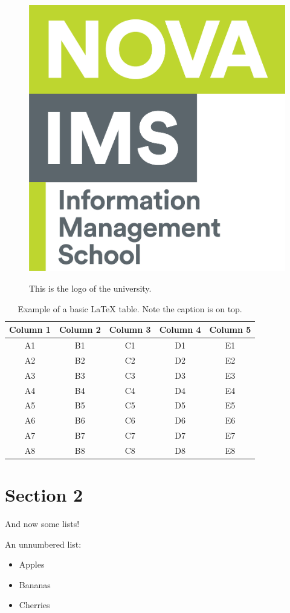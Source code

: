 \begin{figure}[htbp]
    \begin{center}
        \includegraphics[width=.35\textwidth]{Contents/Chapters/1_Main/figures/nova-ims-logo.png}
        \label{fig:nova-logo}
        \caption{This is the logo of the university.}
    \end{center}
\end{figure}

\begin{table}[htbp]
    \centering
    \caption{Example of a basic LaTeX table. Note the caption is on top.}

    \begin{tabular}{|c|c|c|c|c|}
        \hline
        Column 1 & Column 2 & Column 3 & Column 4 & Column 5 \\
        \hline
        A1 & B1 & C1 & D1 & E1 \\
        A2 & B2 & C2 & D2 & E2 \\
        A3 & B3 & C3 & D3 & E3 \\
        A4 & B4 & C4 & D4 & E4 \\
        A5 & B5 & C5 & D5 & E5 \\
        A6 & B6 & C6 & D6 & E6 \\
        A7 & B7 & C7 & D7 & E7 \\
        A8 & B8 & C8 & D8 & E8 \\
        \hline
    \end{tabular}
    \label{tab:example}
\end{table}


\section{Section 2}

And now some lists!

An unnumbered list:

\begin{itemize}
    \item Apples
    \item Bananas
    \item Cherries
\end{itemize}

